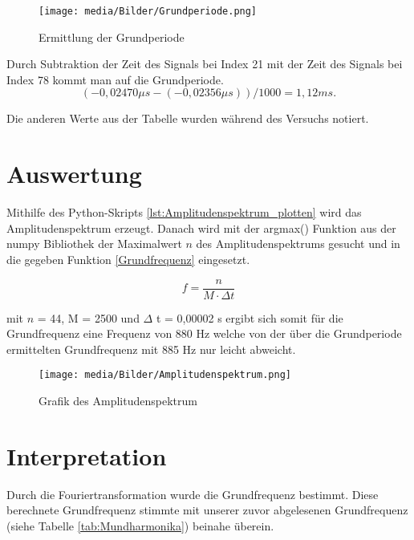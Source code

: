 \documentclass[12pt, oneside, a4paper, \docLanguage]{report}
\begin{document}
\begin{figure}[h]
	\centering
	\texttt{[image: media/Bilder/Grundperiode.png]}
	\caption[Grundperiode]{Ermittlung der Grundperiode}
	\label{fig:Grundperiode}
\end{figure}

\newpage

Durch Subtraktion der Zeit des Signals bei Index 21 mit der Zeit des Signals bei Index 78 kommt man auf die Grundperiode. 
\begin{equation}
(-0,02470\mu s-(-0,02356\mu s))/1000 = 1,12 ms. 
\end{equation}

Die anderen Werte aus der Tabelle wurden während des Versuchs notiert.

\section{Auswertung}
\label{chap:VERSUCH_1_AUSWERTUNG}
Mithilfe des Python-Skripts \ref{lst:Amplitudenspektrum_plotten} wird das Amplitudenspektrum erzeugt.
Danach wird mit der argmax() Funktion aus der numpy Bibliothek der Maximalwert  $n$ des Amplitudenspektrums gesucht und in die gegeben Funktion \ref{Grundfrequenz} eingesetzt.

\begin{equation}\label{Grundfrequenz}
f = \frac{n}{M \cdot \Delta t}
\end{equation}

mit $n$ = 44, M = 2500 und $\Delta$ t = 0,00002 s ergibt sich somit für die Grundfrequenz eine Frequenz von 880 Hz welche von der über die Grundperiode ermittelten Grundfrequenz mit 885 Hz nur leicht abweicht.

\begin{figure}[h]
	\centering
	\texttt{[image: media/Bilder/Amplitudenspektrum.png]}
	\caption[Amplitudenspektrum]{Grafik des Amplitudenspektrum}
	\label{fig:Amplitudenspektrum}
\end{figure}

\section{Interpretation}
\label{chap:VERSUCH_1_INTERPRETATION}

Durch die Fouriertransformation wurde die Grundfrequenz bestimmt. 
Diese berechnete Grundfrequenz stimmte mit unserer zuvor abgelesenen Grundfrequenz (siehe Tabelle \ref{tab:Mundharmonika}) beinahe überein.
\end{document}
